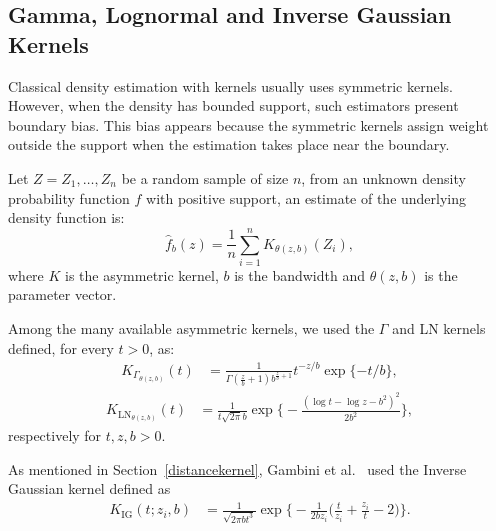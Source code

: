 \documentclass[twocolumn]{svjour3}
\begin{document}
\subsection{Gamma, Lognormal and Inverse Gaussian Kernels}
\label{asymmetrickernel}

Classical density estimation with kernels usually uses symmetric kernels. 
However, when the density has bounded support, such estimators present boundary bias. 
This bias appears because the symmetric kernels assign weight outside the support when the estimation takes place near the boundary.


Let $ Z = Z_1,\dots, Z_n$ be a random sample of size $n$, from an unknown density probability function $f$ with positive support, an estimate of the underlying density function is:
$$
\widehat{f}_b(z)=\frac{1}{n}\sum_{i=1}^n K_{\theta(z,b)}(Z_i),
$$ 
where $K$ is the asymmetric kernel, $b$ is the bandwidth and ${\theta}(z,b)$ is the parameter vector.

Among the many available asymmetric kernels, we used the $\Gamma$ and LN kernels defined, for every $t>0$, as:
\begin{align}
	K_{{\Gamma}_{{\theta}(z,b)}}(t) & =\frac{1}{\Gamma(\frac{z}{b}+1)b^{\frac{z}{b}+1}} t^{-{z}/{b}} \exp\{-{t}/{b}\},
	\label{gammakernel}
\end{align}
\begin{align}
	K_{{\text{{LN}}}_{{\theta}(z,b)}}(t) & =\frac{1}{t \sqrt{2 \pi} b} \exp\Big\{-\frac{\left(\log t - \log z -b^2\right)^2}{2b^2}\Big\},
	\label{LNkernel}
\end{align}
respectively for $t,z,b>0$.

As mentioned in Section~\ref{distancekernel}, Gambini et al.~\cite{gambini2015} used the Inverse Gaussian kernel defined as
\begin{align}
	K_{\text{IG}}( t; z_i,b) & =\frac{1}{\sqrt{2\pi b t^3}} 
	\exp\Big\{-\frac{1}{2b z_i} \Big(\frac{t}{z_i}+\frac{z_i}{t}-2\Big)\Big\}.
\end{align}
\end{document}
